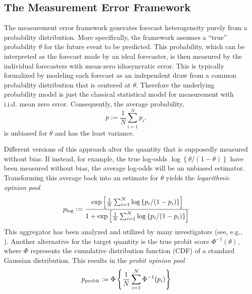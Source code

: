 \documentclass[11pt]{article}
\theoremstyle{definition}
\theoremstyle{definition}
\def\pb{\overline{p}}
\def\probit{p_{\rm probit}}
\def\plog{p_{\rm log}}
\begin{document}
%

\subsection{The Measurement Error Framework}
\label{ss:measurement}

The measurement error framework generates forecast heterogeneity purely from a probability distribution. More specifically, the framework assumes a ``true'' probability
$\theta$  for the future event to be predicted. This probability, which can be interpreted as the  forecast made by an ideal forecaster, is then measured by the individual forecasters with mean-zero idiosyncratic error.  This is typically
formalized by modeling each forecast as an independent draw from a common
probability distribution that is centered at $\theta$. Therefore the underlying probability model is just the 
classical statistical model for measurement with i.i.d. mean zero error. 
Consequently, the average probability,
$$\pb := \frac{1}{N}\sum_{i=1}^N
p_i,$$
is unbiased for $\theta$ and has the least
variance.

Different versions of this approach alter the quantity that is supposedly
measured without bias. If instead, for example, the true log-odds
$\log\left\{\theta/(1-\theta)\right\}$ have been measured without
bias, the average log-odds will be an unbiased estimator. Transforming
this average back into an estimate for $\theta$ yields the {\em
logarithmic opinion pool}
$$\plog := \frac{\exp \left [ \frac{1}{N} \sum_{i=1}^N
   \log \left\{ p_i / (1-p_i) \right\} \right ]} {1 + \exp \left [
\frac{1}{N} \sum_{i=1}^N \log \left\{p_i / (1-p_i)\right\} \right
]} $$ This aggregator has been analyzed and utilized by many
investigators (see, e.g., \citealt{dawid1995coherent, Genest,
bacharach1975group}). Another alternative for the target quantity is
the true probit score $\Phi^{-1}(\theta)$, where $\Phi$ represents the
cumulative distribution function (CDF) of a standard Gaussian
distribution. This results in the {\em probit opinion pool}
$$\probit := \Phi \left\{ \frac{1}{N} \sum_{i=1}^N \Phi^{-1}
   (p_i) \right \} $$
\end{document}
